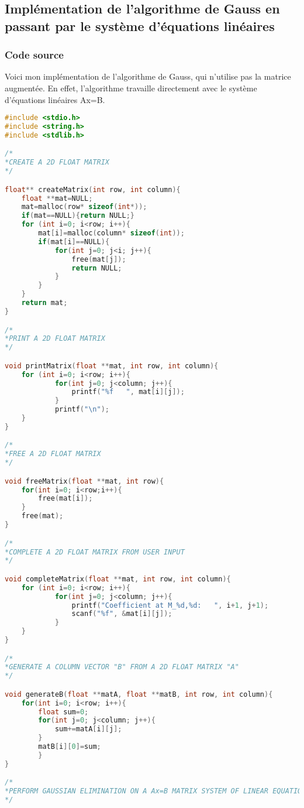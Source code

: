 \documentclass{report}
\begin{document}
\subsection{Implémentation de l'algorithme de Gauss en passant par le système d'équations linéaires}
\subsubsection{Code source}
Voici mon implémentation de l'algorithme de Gauss, qui n'utilise pas la matrice augmentée. En effet, l'algorithme travaille directement avec le système d'équations linéaires Ax=B.\\
\begin{lstlisting}[language=C,inputencoding=utf8, basicstyle=\fontsize{6}{8}\selectfont]
#include <stdio.h>
#include <string.h>
#include <stdlib.h>

/*
*CREATE A 2D FLOAT MATRIX
*/

float** createMatrix(int row, int column){
	float **mat=NULL;
	mat=malloc(row* sizeof(int*));
	if(mat==NULL){return NULL;}
	for (int i=0; i<row; i++){
		mat[i]=malloc(column* sizeof(int));
		if(mat[i]==NULL){
			for(int j=0; j<i; j++){
				free(mat[j]);
				return NULL;
			}
		}
	}
	return mat;
}

/*
*PRINT A 2D FLOAT MATRIX
*/

void printMatrix(float **mat, int row, int column){
	for (int i=0; i<row; i++){
    		for(int j=0; j<column; j++){
         		printf("%f   ", mat[i][j]);
    		}
    		printf("\n");
	}
}

/*
*FREE A 2D FLOAT MATRIX
*/

void freeMatrix(float **mat, int row){
	for(int i=0; i<row;i++){
		free(mat[i]);
	}
	free(mat);
}

/*
*COMPLETE A 2D FLOAT MATRIX FROM USER INPUT
*/

void completeMatrix(float **mat, int row, int column){
	for (int i=0; i<row; i++){
    		for(int j=0; j<column; j++){
    			printf("Coefficient at M_%d,%d:   ", i+1, j+1);
         		scanf("%f", &mat[i][j]);
    		}
	}
}

/*
*GENERATE A COLUMN VECTOR "B" FROM A 2D FLOAT MATRIX "A"
*/

void generateB(float **matA, float **matB, int row, int column){
	for(int i=0; i<row; i++){
		float sum=0;
		for(int j=0; j<column; j++){
			sum+=matA[i][j];
		}
		matB[i][0]=sum;
    	}
}

/*
*PERFORM GAUSSIAN ELIMINATION ON A Ax=B MATRIX SYSTEM OF LINEAR EQUATIONS
*/


\end{lstlisting}
\end{document}
